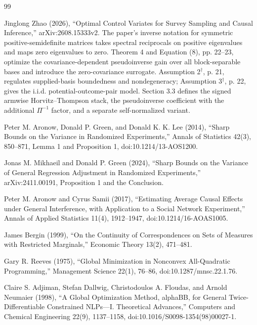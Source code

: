 \documentclass{article}
\begin{document}
\begin{thebibliography}{99}

   Jinglong Zhao (2026), ``Optimal Control Variates for Survey Sampling and Causal Inference,'' arXiv:2608.15333v2.  The paper's inverse notation for symmetric positive-semidefinite matrices takes spectral reciprocals on positive eigenvalues and maps zero eigenvalues to zero.  Theorem 4 and Equation (8), pp. 22--23, optimize the covariance-dependent pseudoinverse gain over all block-separable bases and introduce the zero-covariance surrogate.  Assumption 2\(^{\dagger}\), p. 21, regulates supplied-basis boundedness and nondegeneracy; Assumption 3\(^{\dagger}\), p. 22, gives the i.i.d. potential-outcome-pair model.  Section 3.3 defines the signed armwise Horvitz--Thompson stack, the pseudoinverse coefficient with the additional \(\Pi^{-1}\) factor, and a separate self-normalized variant.

   Peter M. Aronow, Donald P. Green, and Donald K. K. Lee (2014), ``Sharp Bounds on the Variance in Randomized Experiments,'' Annals of Statistics 42(3), 850--871, Lemma 1 and Proposition 1, doi:10.1214/13-AOS1200.

   Jonas M. Mikhaeil and Donald P. Green (2024), ``Sharp Bounds on the Variance of General Regression Adjustment in Randomized Experiments,'' arXiv:2411.00191, Proposition 1 and the Conclusion.

   Peter M. Aronow and Cyrus Samii (2017), ``Estimating Average Causal Effects under General Interference, with Application to a Social Network Experiment,'' Annals of Applied Statistics 11(4), 1912--1947, doi:10.1214/16-AOAS1005.

   James Bergin (1999), ``On the Continuity of Correspondences on Sets of Measures with Restricted Marginals,'' Economic Theory 13(2), 471--481.

   Gary R. Reeves (1975), ``Global Minimization in Nonconvex All-Quadratic Programming,'' Management Science 22(1), 76--86, doi:10.1287/mnsc.22.1.76.

   Claire S. Adjiman, Stefan Dallwig, Christodoulos A. Floudas, and Arnold Neumaier (1998), ``A Global Optimization Method, alphaBB, for General Twice-Differentiable Constrained NLPs---I. Theoretical Advances,'' Computers and Chemical Engineering 22(9), 1137--1158, doi:10.1016/S0098-1354(98)00027-1.


\end{thebibliography}
\end{document}
